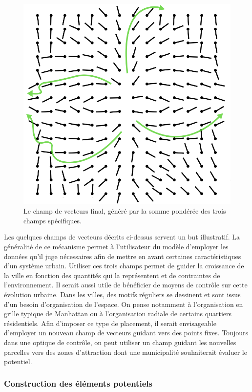 \documentclass[10pt]{article}
\begin{document}
\begin{figure}[H]
  \centering
  \includegraphics[width=.8\linewidth]{images/vf-sum.png}
  \caption{Le champ de vecteurs final, généré par la somme pondérée
    des trois champs spécifiques.}
  \label{fig:field-sum}
\end{figure}

Les quelques champs de vecteurs décrits ci-dessus servent un but
illustratif. La généralité de ce mécanisme permet à l'utilisateur du
modèle d'employer les données qu'il juge nécessaires afin de mettre en
avant certaines caractéristiques d'un système urbain. Utiliser ces
trois champs permet de guider la croissance de la ville en fonction
des quantités qui la représentent et de contraintes de
l'environnement. Il serait aussi utile de bénéficier de moyens de
contrôle sur cette évolution urbaine. Dans les villes, des motifs
réguliers se dessinent et sont issus d'un besoin d'organisation de
l'espace. On pense notamment à l'organisation en grille typique de
Manhattan ou à l'organisation radiale de certains quartiers
résidentiels. Afin d'imposer ce type de placement, il serait
envisageable d'employer un nouveau champ de vecteurs guidant vers des
points fixes. Toujours dans une optique de contrôle, on peut utiliser
un champ guidant les nouvelles parcelles vers des zones d'attraction
dont une municipalité souhaiterait évaluer le potentiel.

\subsubsection{Construction des éléments potentiels}
\end{document}
